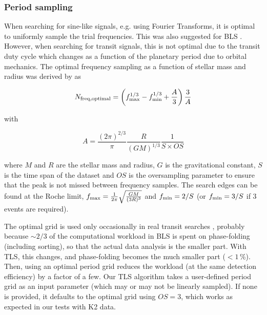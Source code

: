 \documentclass[twocolumn,tighten,longauthor]{myaastex62}
\begin{document}
\subsubsection{Period sampling}
\label{sub:periods}
When searching for sine-like signals, e.g. using Fourier Transforms, it is optimal to uniformly sample the trial frequencies. This was also suggested for BLS \citep{2002A&A...391..369K}. However, when searching for transit signals, this is not optimal due to the transit duty cycle which changes as a function of the planetary period due to orbital mechanics. The optimal frequency sampling as a function of stellar mass and radius was derived by \citep{2014A&A...561A.138O} as

\begin{equation}
N_{\rm freq,{ }optimal} = \left( f_{\rm max}^{1/3} - f_{\rm min}^{1/3} + \frac{A}{3} \right) \frac{3}{A}
\end{equation}

with

\begin{equation}
A=
\frac{(2\pi)^{2/3}}{\pi }
\frac{R}{(GM)^{1/3}}
\frac{1}{S \times OS}
\end{equation}

where $M$ and $R$ are the stellar mass and radius, $G$ is the gravitational constant, $S$ is the time span of the dataset and $OS$ is the oversampling parameter to ensure that the peak is not missed between frequency samples. The search edges can be found at the Roche limit, $f_{\rm max}=\frac{1}{2 \pi} \sqrt{\frac{GM}{(3R)^3}}$ and $f_{\rm min}=2/S$ (or $f_{\rm min}=3/S$ if 3 events are required).

The optimal grid is used only occasionally in real transit searches \citep[e.g.,][]{2018A&A...612A..95B,2018AJ....155...43K,2018AJ....155..127H,2018AJ....155..115L}, probably because $\sim 2/3$ of the computational workload in BLS is spent on phase-folding (including sorting), so that the actual data analysis is the smaller part. With TLS, this changes, and phase-folding becomes the much smaller part ($<1\,$\%). Then, using an optimal period grid reduces the workload (at the same detection efficiency) by a factor of a few. Our TLS algorithm takes a user-defined period grid as an input parameter (which may or may not be linearly sampled). If none is provided, it defaults to the optimal grid using $OS=3$, which works as expected in our tests with K2 data.
\end{document}
